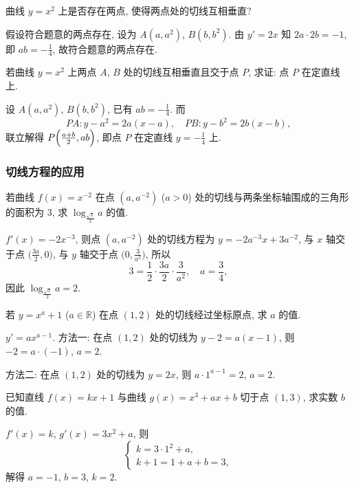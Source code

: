     \varexercise 曲线 $y=x^2$ 上是否存在两点, 使得两点处的切线互相垂直?
        
    假设符合题意的两点存在, 设为 $A(a,a^2)$, $B(b,b^2)$. 由 $y'=2x$ 知 $2a\cdot2b=-1$, 即 $ab=-\frac14$, 故符合题意的两点存在.
    
    \varexercise 若曲线 $y=x^2$ 上两点 $A$, $B$ 处的切线互相垂直且交于点 $P$, 求证: 点 $P$ 在定直线上.
    
    设 $A(a,a^2)$, $B(b,b^2)$, 已有 $ab=-\frac14$. 而
    \[PA\colon y-a^2=2a(x-a),\quad PB\colon y-b^2=2b(x-b),\]
    联立解得 $P\Bigl(\frac{a+b}2,ab\Bigr)$, 即点 $P$ 在定直线 $y=-\frac14$ 上.
  \endsolution
  
  \subsubsection{切线方程的应用}
  \begin{example}
    若曲线 $f(x)=x^{-2}$ 在点 $(a,a^{-2})$ ($a>0$) 处的切线与两条坐标轴围成的三角形的面积为 $3$, 求 $\log_{\frac{\sqrt3}2} a$ 的值.
  \end{example}

  \beginsolution
    $f'(x)=-2x^{-3}$, 则点 $(a,a^{-2})$ 处的切线方程为 $y=-2a^{-3}x+3a^{-2}$, 与 $x$ 轴交于点 $\Big(\frac{3a}2,0\Big)$, 与 $y$ 轴交于点 $\Big(0,\frac3{a^2}\Big)$, 所以 
    \[3=\frac12\cdot \frac{3a}2\cdot \frac3{a^2},\quad a=\frac34,\]
    因此 $\log_{\frac{\sqrt3}2} a=2$.
  \endsolution
  
  \lianxi
  \begin{exercise}
    若 $y=x^a +1$ ($a\in\mathbb{R}$) 在点 $(1,2)$ 处的切线经过坐标原点,
    求 $a$ 的值.
  \end{exercise}

  \beginsolution
    $y'=ax^{a-1}$. 方法一: 在点 $(1,2)$ 处的切线为 $y-2=a(x-1)$, 则 $-2=a\cdot(-1)$, $a=2$.
    
    方法二: 在点 $(1,2)$ 处的切线为 $y=2x$, 则 $a\cdot 1^{a-1}=2$, $a=2$.
  \endsolution
  
  \begin{exercise}
    已知直线 $f(x)=kx+1$ 与曲线 $g(x)=x^3 +ax+b$ 切于点 $(1,3)$, 
    求实数 $b$ 的值.
  \end{exercise}

  \beginsolution
    $f'(x)=k$, $g'(x)=3x^2+a$, 则
    \[\left\{\!\!\begin{array}{l}
      k= 3\cdot 1^2+a,\\
      k+1=1+a+b=3,
      \end{array}\right.\]
    解得 $a=-1$, $b=3$, $k=2$.
  \endsolution
  
